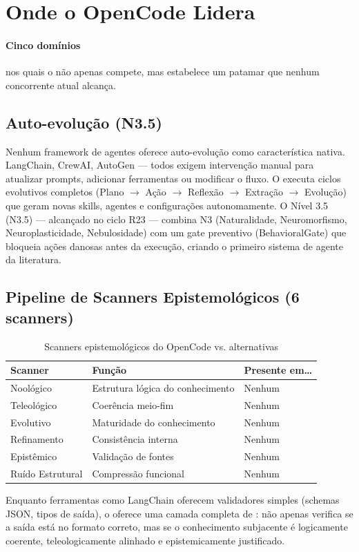 \section{Onde o OpenCode Lidera}
\label{sec:lidera}
\nivelavancado
\paragraph{Cinco domínios} nos quais o \opencodeeco{} não apenas
compete, mas estabelece um patamar que nenhum concorrente atual alcança.
\subsection{Auto-evolução (N3.5)}
Nenhum framework de agentes oferece auto-evolução como característica
nativa. LangChain, CrewAI, AutoGen --- todos exigem intervenção manual
para atualizar prompts, adicionar ferramentas ou modificar o fluxo. O
\opencodeeco{} executa ciclos evolutivos completos (Plano $\rightarrow$
Ação $\rightarrow$ Reflexão $\rightarrow$ Extração $\rightarrow$
Evolução) que geram novas skills, agentes e configurações
autonomamente.
O Nível 3.5 (N3.5) --- alcançado no ciclo R23 --- combina N3
(Naturalidade, Neuromorfismo, Neuroplasticidade, Nebulosidade) com um
gate preventivo (BehavioralGate) que bloqueia ações danosas antes da
execução, criando o primeiro sistema de agente  da literatura.
\subsection{Pipeline de Scanners Epistemológicos (6 scanners)}
\begin{table}[htb]
\centering
\caption{Scanners epistemológicos do OpenCode vs. alternativas}
\label{tab:scanners}
\begin{tabular}{lll}
\toprule
\textbf{Scanner} & \textbf{Função} & \textbf{Presente em\ldots} \\
\midrule
Noológico & Estrutura lógica do conhecimento & Nenhum \\
Teleológico & Coerência meio-fim & Nenhum \\
Evolutivo & Maturidade do conhecimento & Nenhum \\
Refinamento & Consistência interna & Nenhum \\
Epistêmico & Validação de fontes & Nenhum \\
Ruído Estrutural & Compressão funcional & Nenhum \\
\bottomrule
\end{tabular}
\end{table}
\noindent Enquanto ferramentas como LangChain oferecem validadores
simples (schemas JSON, tipos de saída), o \opencodeeco{} oferece uma
camada completa de : não apenas
verifica se a saída está no formato correto, mas se o conhecimento
subjacente é logicamente coerente, teleologicamente alinhado e
epistemicamente justificado.
